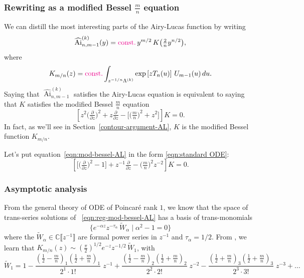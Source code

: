 \documentclass{article}
\theoremstyle{definition}
\newcommand{\C}{\mathbb{C}}
\newcommand{\series}[1]{\tilde{#1}}
\DeclareMathOperator{\Ai}{Ai}
\theoremstyle{plain}
\begin{document}
\subsubsection{Rewriting as a modified Bessel $\frac{m}{n}$ equation}
We can distill the most interesting parts of the Airy-Lucas function by writing
\[ \widehat{\Ai}^{(k)}_{n, m-1}(y) = \textcolor{magenta}{\text{const.}}\,y^{{m/2}}\,K\big(\tfrac{2}{n} y^{n/2}\big), \]
where
\begin{equation}\label{integral:mod-bessel-rational-AL}
K_{m/n}(z) = \textcolor{magenta}{\text{const.}} \int_{z^{-{1/n}}\Lambda^{(k)}} \exp\left[z T_n(u)\right]\,U_{m-1}(u)\,du.
\end{equation}
Saying that $\widehat{\Ai}^{(k)}_{n, m-1}$ satisfies the Airy-Lucas equation is equivalent to saying that $K$ satisfies the modified Bessel $\frac{m}{n}$ equation
\begin{equation}\label{eqn:mod-bessel-AL}
\left[z^2 \big(\tfrac{\partial}{\partial z}\big)^2 + z \tfrac{\partial}{\partial z} - \big[\big(\tfrac{m}{n} \big)^2 + z^2\big]\right] K = 0.
\end{equation}
In fact, as we’ll see in Section~\ref{contour-argument-AL}, $K$ is the modified Bessel function $K_{{m/n}}$.

Let's put equation~\eqref{eqn:mod-bessel-AL} in the form \eqref{eqn:standard ODE}:
\begin{equation}\label{eqn:reg-mod-bessel-AL}
\left[ \big[ \big(\tfrac{\partial}{\partial z}\big)^2 - 1 \big] + z^{-1} \tfrac{\partial}{\partial z} - \big({\tfrac{m}{n}}\big)^2 z^{-2} \right] K = 0.
\end{equation}

\subsubsection{Asymptotic analysis}\label{sec:asympt-AL}

From the general theory of ODE of Poincar\'e rank $1$, we know that the space of trans-series solutions of ~\eqref{eqn:reg-mod-bessel-AL} has a basis of trans-monomials
\[ \{ e^{-\alpha z} z^{-\tau_\alpha}\,\series{W}_\alpha \mid \alpha^2 - 1 = 0 \} \]
where the $\series{W}_\alpha\in\C\llbracket z^{-1} \rrbracket$ are formal power series in $z^{-1}$ and $\tau_\alpha=1/2$. From \cite[Equations 10.40.2 and 10.17.1]{dlmf}, we learn that $K_{m/n}(z) \sim \left(\tfrac{\pi}{2}\right)^{1/2} e^{-z} z^{-1/2}\,\series{W}_1$, with
\begin{equation}\label{bessel-asymp-AL}
\series{W}_1 = 1 - \frac{(\tfrac{1}{2}-\tfrac{m}{n})_1 (\tfrac{1}{2}+\frac{m}{n})_1}{2^1 \cdot 1!}\;z^{-1} + \frac{(\tfrac{1}{2}-\tfrac{m}{n})_2 (\tfrac{1}{2}+\tfrac{m}{n})_2}{2^2 \cdot 2!}\;z^{-2} - \frac{(\tfrac{1}{2}+\tfrac{m}{n})_3 (\tfrac{1}{2}+\tfrac{m}{n})_3}{2^3 \cdot 3!}\;z^{-3} + \ldots
\end{equation}
\end{document}
